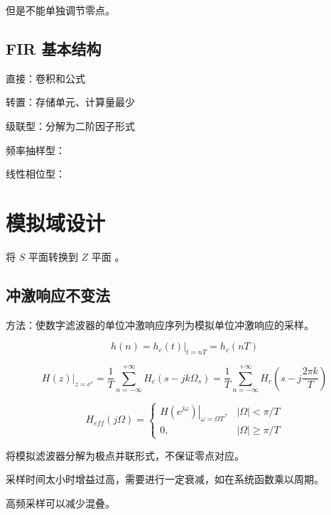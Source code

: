 \documentclass[cn,11pt,chinese,black,simple]{elegantbook}
\begin{document}
但是不能单独调节零点。

\subsection{FIR 基本结构}

直接：卷积和公式

转置：存储单元、计算量最少

级联型：分解为二阶因子形式

频率抽样型：

线性相位型：

\section{模拟域设计}


将 \(S\) 平面转换到 \(Z\) 平面 。

\subsection{冲激响应不变法}


方法：使数字滤波器的单位冲激响应序列为模拟单位冲激响应的采样。

\[
h(n)=\left.h_{c}(t)\right|_{t=n T}=h_{c}(n T)
\]

\[
\left.H(z)\right|_{z=e^{r}}=\frac{1}{T} \sum_{n=-\infty}^{+\infty} H_{c}\left(s-j k \Omega_{s}\right)=\frac{1}{T} \sum_{n=-\infty}^{+\infty} H_{c}\left(s-j \frac{2 \pi k}{T}\right)
\]

\[
H_{e f f}(j \Omega)=\left\{\begin{array}{cc}
\left.H\left(e^{j \omega}\right)\right|_{\omega=\Omega T}, & |\Omega|<\pi / T \\
0, & |\Omega| \geq \pi / T
\end{array}\right.
\]

将模拟滤波器分解为极点并联形式，不保证零点对应。

采样时间太小时增益过高，需要进行一定衰减，如在系统函数乘以周期。

高频采样可以减少混叠。




\let\chapname\undefined
\ifx\mainclass\undefined
\end{document}
